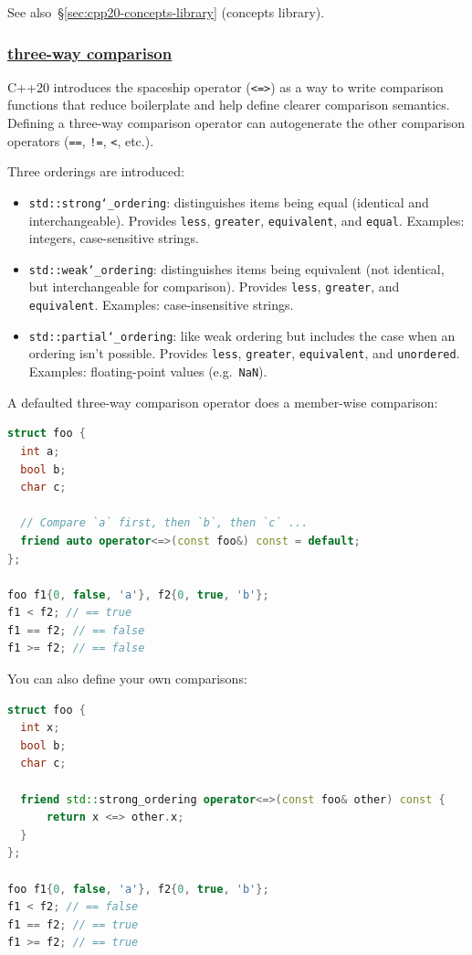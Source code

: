 See also~\S\ref{sec:cpp20-concepts-library} (concepts library).

\subsubsection{\href{https://github.com/AnthonyCalandra/modern-cpp-features/tree/master\#three-way-comparison}
                    {three-way comparison}}
C++20 introduces the spaceship operator (\texttt{<=>}) as a way to write comparison 
functions that reduce boilerplate and help define clearer comparison semantics. 
Defining a three-way comparison operator can autogenerate the other comparison 
operators (\texttt{==}, \texttt{!=}, \texttt{<}, etc.).

Three orderings are introduced:
\begin{itemize}
    \item \texttt{std::strong\char`_ordering}: distinguishes items being equal 
          (identical and interchangeable). Provides \texttt{less}, \texttt{greater}, 
          \texttt{equivalent}, and \texttt{equal}. Examples: integers, case-sensitive strings.
    \item \texttt{std::weak\char`_ordering}: distinguishes items being equivalent 
          (not identical, but interchangeable for comparison). Provides \texttt{less}, 
          \texttt{greater}, and \texttt{equivalent}. Examples: case-insensitive strings.
    \item \texttt{std::partial\char`_ordering}: like weak ordering but includes the 
          case when an ordering isn't possible. Provides \texttt{less}, \texttt{greater}, 
          \texttt{equivalent}, and \texttt{unordered}. Examples: floating-point values (e.g.\ \texttt{NaN}).
\end{itemize}

A defaulted three-way comparison operator does a member-wise comparison:
\begin{lstlisting}[language=C++]
struct foo {
  int a;
  bool b;
  char c;

  // Compare `a` first, then `b`, then `c` ...
  friend auto operator<=>(const foo&) const = default;
};

foo f1{0, false, 'a'}, f2{0, true, 'b'};
f1 < f2; // == true
f1 == f2; // == false
f1 >= f2; // == false
\end{lstlisting}

You can also define your own comparisons:
\begin{lstlisting}[language=C++]
struct foo {
  int x;
  bool b;
  char c;

  friend std::strong_ordering operator<=>(const foo& other) const {
      return x <=> other.x;
  }
};

foo f1{0, false, 'a'}, f2{0, true, 'b'};
f1 < f2; // == false
f1 == f2; // == true
f1 >= f2; // == true
\end{lstlisting}

